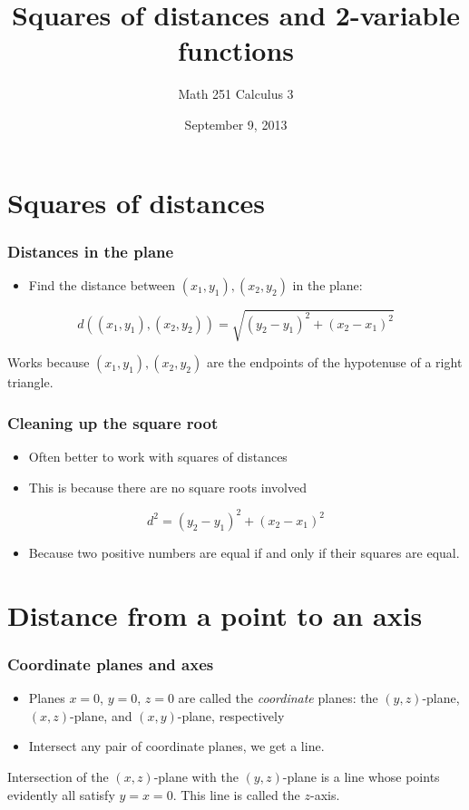 \documentclass[11pt,ignorenonframetext,aspectratio=169]{beamer}
\title{Squares of distances and 2-variable functions}
\author{Math 251 Calculus 3}
\date{September 9, 2013 }
\begin{document}
\frame{\titlepage}

\section{Squares of distances}

\begin{frame}\frametitle{Distances in the plane}

\begin{itemize}[<+->]

\item
  Find the distance between $(x_1, y_1), (x_2, y_2)$ in the plane:
\end{itemize}

\[ d((x_1, y_1), (x_2, y_2)) = \sqrt{(y_2 - y_1)^2 + (x_2 - x_1)^2} \]

Works because $(x_1, y_1), (x_2, y_2)$ are the endpoints of the
hypotenuse of a right triangle.

\end{frame}

\begin{frame}\frametitle{Cleaning up the square root}

\begin{itemize}[<+->]
\item
  Often better to work with squares of distances
\item
  This is because there are no square roots involved
\end{itemize}

\[ d^2 = (y_2 - y_1)^2 + (x_2 - x_1)^2 \]

\begin{itemize}[<+->]

\item
  Because two positive numbers are equal if and only if their squares
  are equal.
\end{itemize}

\end{frame}

\section{Distance from a point to an axis}

\begin{frame}\frametitle{Coordinate planes and axes}

\begin{itemize}[<+->]
\item
  Planes $x = 0$, $y = 0$, $z = 0$ are called the \emph{coordinate}
  planes: the $(y,z)$-plane, $(x,z)$-plane, and $(x,y)$-plane,
  respectively
\item
  Intersect any pair of coordinate planes, we get a line.
\end{itemize}

Intersection of the $(x,z)$-plane with the $(y,z)$-plane is a line whose
points evidently all satisfy $y = x = 0$. This line is called the
$z$-axis.

\end{frame}
\end{document}
